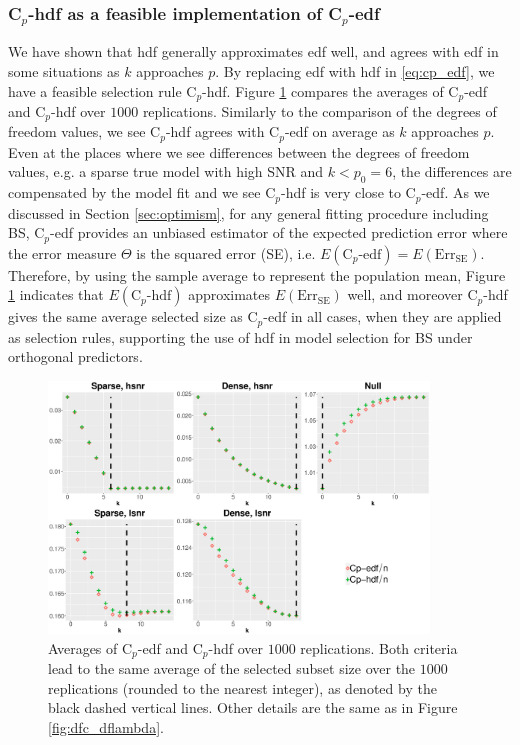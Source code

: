 \subsubsection{\texorpdfstring{C$_p$}{Lg}-hdf as a feasible implementation of \texorpdfstring{C$_p$}{Lg}-edf }
\label{sec:cp_edf_hdf}
We have shown that hdf generally approximates edf well, and agrees with edf in some situations as $k$ approaches $p$. By replacing edf with hdf in \eqref{eq:cp_edf}, we have a feasible selection rule C$_p$-hdf. Figure \ref{fig:cp_edf_hdf} compares the averages of C$_p$-edf and C$_p$-hdf over $1000$ replications. Similarly to the comparison of the degrees of freedom values, we see C$_p$-hdf agrees with C$_p$-edf on average as $k$ approaches $p$. Even at the places where we see differences between the degrees of freedom values, e.g. a sparse true model with high SNR and $k<p_0=6$, the differences are compensated by the model fit and we see C$_p$-hdf is very close to C$_p$-edf. As we discussed in Section \ref{sec:optimism}, for any general fitting procedure including BS, C$_p$-edf provides an unbiased estimator of the expected prediction error where the error measure $\Theta$ is the squared error (SE), i.e. $E(\text{C}_p\text{-edf}) = E(\text{Err}_{\text{SE}})$. Therefore, by using the sample average to represent the population mean, Figure \ref{fig:cp_edf_hdf} indicates that $E(\text{C}_p\text{-hdf})$ approximates $E(\text{Err}_{\text{SE}})$ well, and moreover C$_p$-hdf gives the same average selected size as C$_p$-edf in all cases, when they are applied as selection rules, supporting the use of hdf in model selection for BS under orthogonal predictors.

\begin{figure}[!ht]
	\centering
	\includegraphics[width=0.9\textwidth]{figures/cp_edf_hdf_bs.eps}
	\caption{Averages of C$_p$-edf and C$_p$-hdf over $1000$ replications. Both criteria lead to the same average of the selected subset size over the $1000$ replications (rounded to the nearest integer), as denoted by the black dashed vertical lines. Other details are the same as in Figure \ref{fig:dfc_dflambda}.}
	\label{fig:cp_edf_hdf} 
\end{figure}


